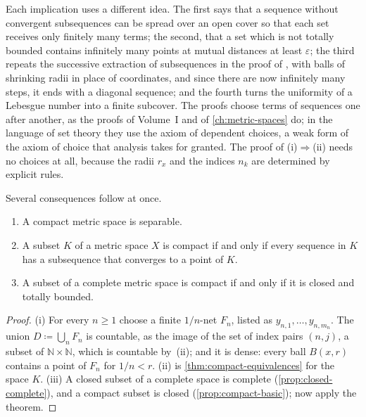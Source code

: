 Each implication uses a different idea. The first says that a sequence without convergent subsequences can be spread over an open cover so that each set receives only finitely many terms; the second, that a set which is not totally bounded contains infinitely many points at mutual distances at least $\varepsilon$; the third repeats the successive extraction of subsequences in the proof of , with balls of shrinking radii in place of coordinates, and since there are now infinitely many steps, it ends with a diagonal sequence; and the fourth turns the uniformity of a Lebesgue number into a finite subcover. The proofs choose terms of sequences one after another, as the proofs of Volume~I and of \cref{ch:metric-spaces} do; in the language of set theory they use the axiom of dependent choices, a weak form of the axiom of choice that analysis takes for granted. The proof of (i)$\Rightarrow$(ii) needs no choices at all, because the radii $r_x$ and the indices $n_k$ are determined by explicit rules.

Several consequences follow at once.

\begin{corollary}
\label{cor:compact-consequences}
\leavevmode
\begin{enumerate}
\item A compact metric space is separable.
\item A subset $K$ of a metric space $X$ is compact if and only if every sequence in $K$ has a subsequence that converges to a point of $K$.
\item A subset of a complete metric space is compact if and only if it is closed and totally bounded.
\end{enumerate}
\end{corollary}

\begin{proof}
(i) For every $n\ge1$ choose a finite $1/n$-net $F_n$, listed as $y_{n,1},\ldots,y_{n,m_n}$. The union $D\coloneqq\bigcup_nF_n$ is countable, as the image of the set of index pairs $(n,j)$, a subset of $\mathbb N\times\mathbb N$, which is countable by \,(ii); and it is dense: every ball $B(x,r)$ contains a point of $F_n$ for $1/n<r$. (ii) is \cref{thm:compact-equivalences} for the space $K$. (iii) A closed subset of a complete space is complete (\cref{prop:closed-complete}), and a compact subset is closed (\cref{prop:compact-basic}); now apply the theorem.
\end{proof}

